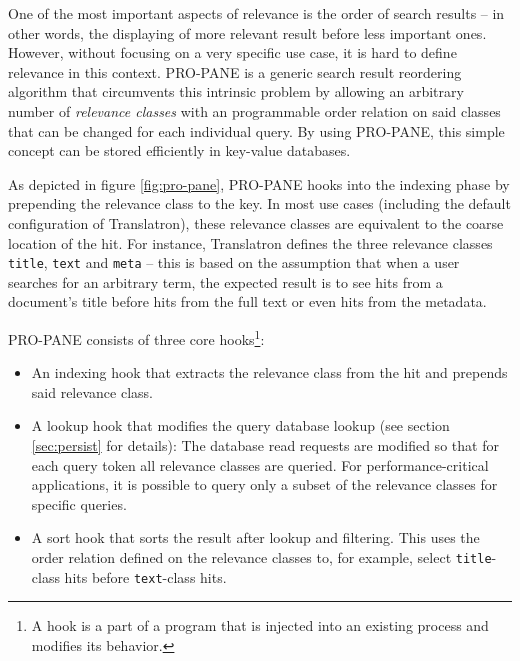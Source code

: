 \documentclass[a4paper, 12pt, twoside, reqn]{report}
\numberwithin{figure}{chapter}
\newtheorem[L]{boxedDefinition}{Definition}
\newtheorem[L]{boxedExample}{Example}
\begin{document}
One of the most important aspects of relevance is the order of search results -- in other words, the displaying of more relevant result before less important ones. However, without focusing on a very specific use case, it is hard to define relevance in this context. PRO-PANE is a generic search result reordering algorithm that circumvents this intrinsic problem by allowing an arbitrary number of \textit{relevance classes} with an programmable order relation on said classes that can be changed for each individual query. By using PRO-PANE, this simple concept can be stored efficiently in key-value databases.

As depicted in figure \ref{fig:pro-pane}, PRO-PANE hooks into the indexing phase by prepending the relevance class to the key. In most use cases (including the default configuration of Translatron), these relevance classes are equivalent to the coarse location of the hit. For instance, Translatron defines the three relevance classes \texttt{title}, \texttt{text} and \texttt{meta} -- this is based on the assumption that when a user searches for an arbitrary term, the expected result is to see hits from a document's title before hits from the full text or even hits from the metadata.

PRO-PANE consists of three core hooks\footnote{A hook is a part of a program that is injected into an existing process and modifies its behavior.}:
\begin{itemize}
 \item An indexing hook that extracts the relevance class from the hit and prepends said relevance class.
 \item A lookup hook that modifies the query database lookup (see section \ref{sec:persist} for details): The database read requests are modified so that for each query token all relevance classes are queried. For performance-critical applications, it is possible to query only a subset of the relevance classes for specific queries.
 \item A sort hook that sorts the result after lookup and filtering. This uses the order relation defined on the relevance classes to, for example, select \texttt{title}-class hits before \texttt{text}-class hits.
\end{itemize}
\end{document}
